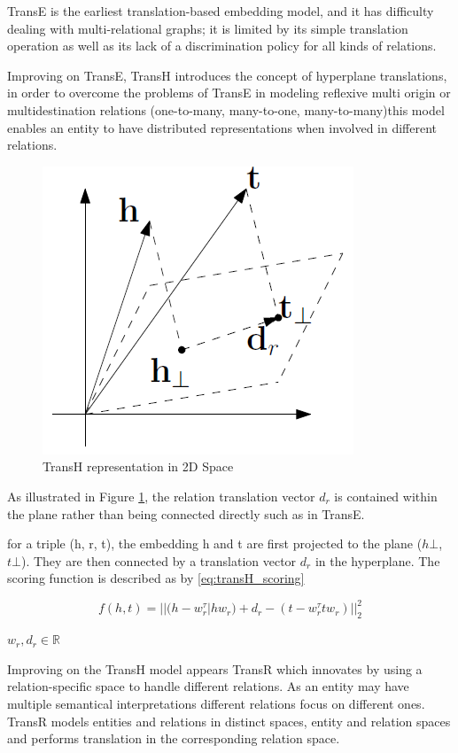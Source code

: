 TransE is the earliest translation-based embedding model, and it has difficulty dealing with multi-relational graphs; it is limited by its simple translation operation as well as its lack of a discrimination policy for all kinds of relations.

Improving on TransE, TransH introduces the concept of hyperplane translations, in order to overcome the problems of TransE in modeling reflexive multi origin or multidestination relations (one-to-many, many-to-one, many-to-many)this model enables an entity to have distributed representations when involved in different relations. 

\begin{figure}[!htp]
    \centering
    \includegraphics[width=.4\textwidth]{fig/embeddings/TransH.png}
    \caption{TransH representation in 2D Space}
    \label{fig:emb-transH}
\end{figure}

As illustrated in Figure \ref{fig:emb-transH}, the relation translation vector $d_r$ is contained within the plane rather than being connected directly such as in TransE.

for a triple (h, r, t), the embedding h and t are first projected to the plane ($h\bot$, $t\bot$). They are then connected by a translation vector $d_r$ in the hyperplane. The scoring function is described as by \ref{eq:transH_scoring}

\begin{equation}
    \label{eq:transH_scoring}
    f (h, t) = || (h - w^\tau_r |hw_r) + d_r - (t-w^\tau_r tw_r) ||^2_2
\end{equation}
\begin{center}
    $w_r, d_r \in \mathbb{R}$
\end{center}

Improving on the TransH model appears TransR\cite{} which innovates by using a relation-specific space to handle different relations. As an entity may have multiple semantical interpretations different relations focus on different ones. TransR models entities and relations in distinct spaces, entity and relation spaces and performs translation in the corresponding relation space.

